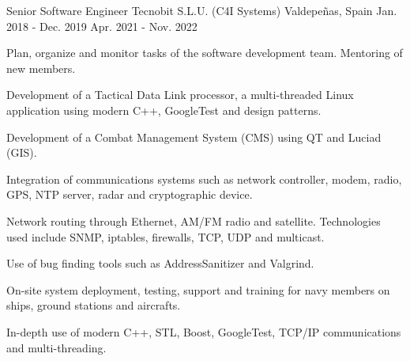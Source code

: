 

\begin{cventries}

  \cventry
    {Senior Software Engineer} %
    {Tecnobit S.L.U. (C4I Systems)} %
    {Valdepeñas, Spain} %
    {Jan. 2018 - Dec. 2019  \newline   Apr. 2021 - Nov. 2022} %
    {
      \begin{cvitems} %
        \item {Plan, organize and monitor tasks of the software development team. Mentoring of new members.}
        \item {Development of a Tactical Data Link processor, a multi-threaded Linux application using modern C++, GoogleTest and design patterns.}
        \item {Development of a Combat Management System (CMS) using QT and Luciad (GIS).}
        \item {Integration of communications systems such as network controller, modem, radio, GPS, NTP server, radar and cryptographic device.}
        \item {Network routing through Ethernet, AM/FM radio and satellite. Technologies used include SNMP, iptables, firewalls, TCP, UDP and multicast.}
        \item {Use of bug finding tools such as AddressSanitizer and Valgrind. }
        \item {On-site system deployment, testing, support and training for navy members on ships, ground stations and aircrafts.}
        \item {In-depth use of modern C++, STL, Boost, GoogleTest, TCP/IP communications and multi-threading.}
      \end{cvitems}
    }


\end{cventries}
